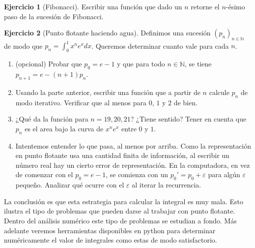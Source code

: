 \documentclass[a4paper,12pt]{book}
\newcommand{\N}{\mathbb{N}}
\theoremstyle{definition}
\newtheorem{ejercicio}{Ejercicio}
\begin{document}
	\begin{ejercicio}[Fibonacci]
		Escribir una función que dado un $n$ retorne el $n$-ésimo paso de la sucesión de Fibonacci.
	\end{ejercicio}
	
	\begin{ejercicio}[Punto flotante haciendo agua]
		Definimos una sucesión $(p_n)_{n\in\N}$ de modo que $p_n = \int_0^1x^ne^xdx$. Queremos determinar cuanto vale para cada $n$.
		\begin{enumerate}
			\item (opcional) Probar que $p_0=e-1$ y que para todo $n\in\N$, se tiene $p_{n+1}=e-(n+1)p_n$.
			\item Usando la parte anterior, escribir una función que a partir de $n$ calcule $p_n$ de modo iterativo. Verificar que al menos para $0$, $1$ y $2$ de bien.
			\item ¿Qué da la función para $n=19,20,21$? ¿Tiene sentido? Tener en cuenta que $p_n$ es el area bajo la curva de $x^ne^x$ entre $0$ y $1$.
			\item Intentemos entender lo que pasa, al menos por arriba. Como la representación en punto flotante usa una cantidad finita de información, al escribir un número real hay un cierto error de representación. En la computadora, en vez de comenzar con el $p_0 = e-1$, se comienza con un $p_0' = p_0 +\varepsilon$ para algún $\varepsilon$ pequeño. Analizar qué ocurre con el $\varepsilon$ al iterar la recurrencia.
		\end{enumerate}
		La conclusión es que esta estrategia para calcular la integral es muy mala. Esto ilustra el tipo de problemas que pueden darse al trabajar con punto flotante. Dentro del análisis numérico este tipo de problemas se estudian a fondo. Más adelante veremos herramientas disponibles en python para determinar numéricamente el valor de integrales como estas de modo satisfactorio.
	\end{ejercicio}
	
\end{document}
